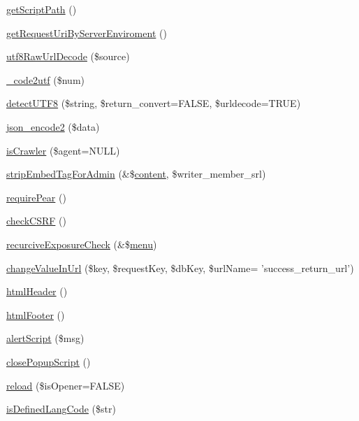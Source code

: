 \begin{DoxyCompactItemize}
\item 
\hyperlink{func_8inc_8php_a1086859329d03f8830d51d254c18e47e}{get\-Script\-Path} ()
\item 
\hyperlink{func_8inc_8php_a372c0e65e6e4778fc4e97b1fc3775463}{get\-Request\-Uri\-By\-Server\-Enviroment} ()
\item 
\hyperlink{func_8inc_8php_af1649820887f052ce1f1c9ca623f2db3}{utf8\-Raw\-Url\-Decode} (\$source)
\item 
\hyperlink{func_8inc_8php_a07446b33f4eda53315b12fc1c1b15f5a}{\-\_\-code2utf} (\$num)
\item 
\hyperlink{func_8inc_8php_a97f60adff3c4bbb5a341a557eef742b0}{detect\-U\-T\-F8} (\$string, \$return\-\_\-convert=F\-A\-L\-S\-E, \$urldecode=T\-R\-U\-E)
\item 
\hyperlink{func_8inc_8php_a3c49ddc63881e57fc5dd1aa4f923ef0c}{json\-\_\-encode2} (\$data)
\item 
\hyperlink{func_8inc_8php_a490ffbd4821da1995c76c381553d5b3d}{is\-Crawler} (\$agent=N\-U\-L\-L)
\item 
\hyperlink{func_8inc_8php_ad6d8ff5f851d62d39b170a46b766d834}{strip\-Embed\-Tag\-For\-Admin} (\&\$\hyperlink{classcontent}{content}, \$writer\-\_\-member\-\_\-srl)
\item 
\hyperlink{func_8inc_8php_ad09c8e07e96c499b4b71d54c2950e704}{require\-Pear} ()
\item 
\hyperlink{func_8inc_8php_a887fd7fe841f5dac3179296ae770172a}{check\-C\-S\-R\-F} ()
\item 
\hyperlink{func_8inc_8php_a229b3ea7ca966e907d266bc60efa353b}{recurcive\-Exposure\-Check} (\&\$\hyperlink{classmenu}{menu})
\item 
\hyperlink{func_8inc_8php_a2382c81f5a0708850f8790668edcaf90}{change\-Value\-In\-Url} (\$key, \$request\-Key, \$db\-Key, \$url\-Name= 'success\-\_\-return\-\_\-url')
\item 
\hyperlink{func_8inc_8php_adf603cdce37b515631c58bb3acffa614}{html\-Header} ()
\item 
\hyperlink{func_8inc_8php_a2f21eda8628bd378f56529cb680006b0}{html\-Footer} ()
\item 
\hyperlink{func_8inc_8php_acc16be2ad7371ac6478f2314f1248fe2}{alert\-Script} (\$msg)
\item 
\hyperlink{func_8inc_8php_a11562ea030a5d83564d0fbfcfabc8af9}{close\-Popup\-Script} ()
\item 
\hyperlink{func_8inc_8php_aaf78eccbde1406d602a7c408a364be24}{reload} (\$is\-Opener=F\-A\-L\-S\-E)
\item 
\hyperlink{func_8inc_8php_ae8cde5329bde1011f16fcc3f84b16746}{is\-Defined\-Lang\-Code} (\$str)

\end{DoxyCompactItemize}
